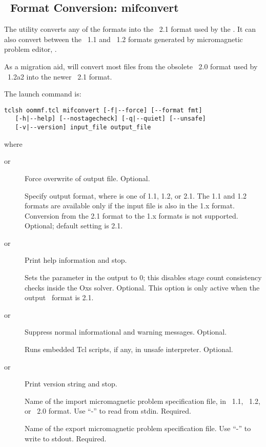 \subsection{\MIF\ Format Conversion: mifconvert}\label{sec:mifconvert}%

The  utility converts any
of the
 formats into the
\MIF~2.1 format used by the
.
It can also convert between
the  \MIF~1.1 and \MIF~1.2
formats generated by micromagnetic problem editor,
.

As a migration aid,  will convert most files from the
obsolete \MIF~2.0 format used by \OOMMF\ 1.2a2 into the newer
\MIF~2.1 format.

The  launch command is:
\begin{verbatim}
tclsh oommf.tcl mifconvert [-f|--force] [--format fmt]
   [-h|--help] [--nostagecheck] [-q|--quiet] [--unsafe]
   [-v|--version] input_file output_file
\end{verbatim}
where
\begin{description}
\item[ or ]
  Force overwrite of output file.  Optional.
\item[]
  Specify output format, where  is one of 1.1, 1.2, or 2.1.  The
  1.1 and 1.2 formats are available only if the input file is also in
  the 1.x format.  Conversion from the 2.1 format to the 1.x formats is
  not supported.  Optional; default setting is 2.1.
\item[ or ]
  Print help information and stop.
\item[]
  Sets the  parameter in the output
  to 0;
 this disables stage count consistency checks inside the Oxs
 solver. Optional.
 This option is only active when the output \MIF\ format is 2.1.
\item[ or ]
  Suppress normal informational and warning messages.  Optional.
\item[]
  Runs embedded Tcl scripts, if any, in unsafe interpreter.  Optional.
\item[ or ]
  Print version string and stop.
\item[]
  Name of the import micromagnetic problem specification file, in
  \MIF~1.1, \MIF~1.2, or \MIF~2.0 format.  Use ``-'' to read from stdin.
  Required.
\item[]
  Name of the export micromagnetic problem specification file. Use ``-''
  to write to stdout.  Required.
\end{description}

